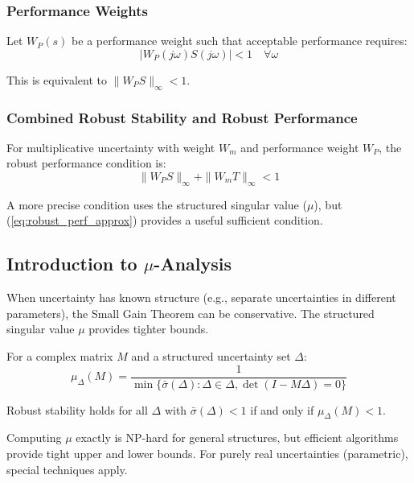\subsubsection{Performance Weights}

Let $W_P(s)$ be a performance weight such that acceptable performance requires:
\begin{equation}
|W_P(j\omega) S(j\omega)| < 1 \quad \forall \omega
\end{equation}

This is equivalent to $\|W_P S\|_\infty < 1$.

\subsubsection{Combined Robust Stability and Robust Performance}

For multiplicative uncertainty with weight $W_m$ and performance weight $W_P$, the robust performance condition is:
\begin{equation}
\|W_P S\|_\infty + \|W_m T\|_\infty < 1
\label{eq:robust_perf_approx}
\end{equation}

A more precise condition uses the structured singular value ($\mu$), but (\ref{eq:robust_perf_approx}) provides a useful sufficient condition.

\subsection{Introduction to $\mu$-Analysis}
\label{subsec:mu}

When uncertainty has known structure (e.g., separate uncertainties in different parameters), the Small Gain Theorem can be conservative. The structured singular value $\mu$ provides tighter bounds.

\begin{definition}
For a complex matrix $M$ and a structured uncertainty set $\Delta$:
\begin{equation}
\mu_\Delta(M) = \frac{1}{\min\{\bar{\sigma}(\Delta) : \Delta \in \Delta, \det(I - M\Delta) = 0\}}
\label{eq:mu_def}
\end{equation}
\end{definition}

Robust stability holds for all $\Delta$ with $\bar{\sigma}(\Delta) < 1$ if and only if $\mu_\Delta(M) < 1$.

Computing $\mu$ exactly is NP-hard for general structures, but efficient algorithms provide tight upper and lower bounds. For purely real uncertainties (parametric), special techniques apply.


